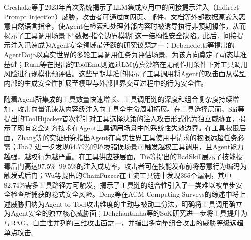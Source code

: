 Greshake等\cite{greshake2023notwhat}于2023年首次系统揭示了LLM集成应用中的间接提示注入（Indirect Prompt Injection）威胁，攻击者可通过向网页、邮件、文档等外部数据源嵌入恶意自然语言指令，使Agent在检索和处理外部内容时被诱导执行非预期操作，从而揭示了工具调用场景下“数据-指令边界模糊”这一结构性安全缺陷。此后，间接提示注入迅速成为Agent安全领域最活跃的研究议题之一：Debenedetti等\cite{balunovic2024agentdojo}提出的AgentDojo以真实世界的多轮工具调用任务为评估场景，为该方向奠定了动态基准基础；Ruan等\cite{ruan2024toolemu}在提出的ToolEmu则通过LM仿真沙箱在无副作用条件下对工具调用风险进行规模化预评估。这些早期基准的揭示了工具调用将Agent的攻击面从模型内部的生成安全性扩展至模型与外部世界交互过程中的行为安全性。

随着Agent所集成的工具数量快速增长、工具调用链的深度和组合复杂度持续增加，攻击向量迅速从内容级注入向工具全生命周期拓展。在工具选择层面，Shi等\cite{shi2026pitoolselection}提出的ToolHijacker首次将针对工具选择决策的注入攻击形式化为独立威胁面，揭示了现有安全对齐技术在Agent工具调用场景中的系统性失效边界。在工具权限层面，Zhang等\cite{zhang2026evaluatingprivilege}的实证研究指出Agent在真实世界工具使用中请求的权限远超任务必需；Jha等\cite{jha2026agent}进一步发现64.79\%的环境错误场景可触发越权工具调用，且Agent能力越强，越权行为越严重。在工具供应链层面，Tie等\cite{tie2026badskill}提出的BadSkill展示了技能投毒后门高达97.5\%--99.5\%的注入成功率，攻击者可在技能发布前将恶意行为编码为触发式后门；Wu等\cite{wu2026chainfuzzer}提出的ChainFuzzer在主流工具链中发现365个漏洞，其中82.74\%需多工具路径方可触发，揭示了工具链的组合性引入了一类难以被单步安全检查所捕获的隐式安全风险。Deng等\cite{deng2025agentsunderthreat}在ACM Computing Surveys的综述中将上述威胁归纳为Agent-to-Tool攻击维度的主动与被动二分法，明确将工具调用确立为Agent安全的独立核心威胁面；Dehghantanha等\cite{dehghantanha2026sokattacksurfaceagentic}的SoK研究进一步将工具提升为与RAG、自主性并列的三维攻击面之一，并指出多向量组合攻击的威胁等级远超单点攻击。

